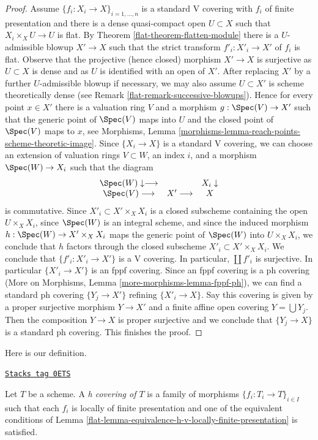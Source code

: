 \begin{proof}
\medskip\noindent
Assume $\{f_i : X_i \to X\}_{i = 1, \ldots, n}$ is a standard V covering
with $f_i$ of finite presentation and there is a dense quasi-compact open
$U \subset X$ such that $X_i \times_X U \to U$ is flat.
By Theorem \ref{flat-theorem-flatten-module}
there is a $U$-admissible blowup $X' \to X$ such that
the strict transform $f'_i : X'_i \to X'$ of $f_i$ is flat.
Observe that the projective (hence closed) morphism $X' \to X$
is surjective as $U \subset X$ is dense and as $U$ is identified
with an open of $X'$. After replacing $X'$ by a further
$U$-admissible blowup if necessary,
we may also assume $U \subset X'$ is scheme theoretically dense
(see Remark \ref{flat-remark-successive-blowups}).
Hence for every point $x \in X'$ there is a valuation ring $V$
and a morphism $g : \Spec(V) \to X'$ such that the generic
point of $\Spec(V)$ maps into $U$ and the closed point of
$\Spec(V)$ maps to $x$, see Morphisms, Lemma
\ref{morphisms-lemma-reach-points-scheme-theoretic-image}.
Since $\{X_i \to X\}$ is a standard V covering, we can choose
an extension of valuation rings $V \subset W$, an index $i$, and a morphism
$\Spec(W) \to X_i$ such that the diagram
$$
\begin{array}{ccc}\Spec(W) \downarrow\longrightarrow &  & X_i \downarrow \\ \Spec(V) \longrightarrow & X' \longrightarrow & X\end{array}
$$
is commutative. Since $X'_i \subset X' \times_X X_i$ is a closed subscheme
containing the open $U \times_X X_i$, since $\Spec(W)$ is an integral scheme,
and since the induced morphism $h : \Spec(W) \to X' \times_X X_i$ maps
the generic point of $\Spec(W)$ into $U \times_X X_i$, we conclude
that $h$ factors through the closed subscheme $X'_i \subset X' \times_X X_i$.
We conclude that $\{f'_i : X'_i \to X'\}$ is a V covering.
In particular, $\coprod f'_i$ is surjective. In particular
$\{X'_i \to X'\}$ is an fppf covering. Since an fppf covering is a ph covering
(More on Morphisms, Lemma \ref{more-morphisms-lemma-fppf-ph}),
we can find a standard ph covering $\{Y_j \to X'\}$ refining
$\{X'_i \to X\}$. Say this covering is given by a proper surjective
morphism $Y \to X'$ and a finite affine open covering
$Y = \bigcup Y_j$. Then the composition $Y \to X$ is proper surjective
and we conclude that $\{Y_j \to X\}$ is a standard ph covering.
This finishes the proof.
\end{proof}

Here is our definition.

\begin{definition}[H covering]
\label{flat-definition-h-covering}
\href{https://stacks.math.columbia.edu/tag/0ETS}{\texttt{Stacks tag 0ETS}}

Let $T$ be a scheme. A {\it h covering of $T$} is a family of morphisms
$\{f_i : T_i \to T\}_{i \in I}$ such that each $f_i$ is
locally of finite presentation and one of the equivalent conditions of
Lemma \ref{flat-lemma-equivalence-h-v-locally-finite-presentation} is satisfied.
\end{definition}

